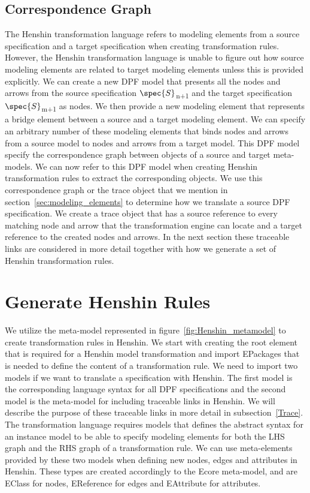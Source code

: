 \subsection{Correspondence Graph}
The Henshin transformation language refers to modeling elements from a source
specification and a target specification when creating transformation rules.
However, the Henshin transformation language is unable to figure out how source
modeling elements are related to target modeling elements unless this is
provided explicitly. We can create a new DPF model that presents all the nodes
and arrows from the source specification $\spec{S}$\textsubscript{n+1} and
the target specification $\spec{S}$\textsubscript{m+1} as nodes. We then provide
a new modeling element that represents a bridge element between a source and a
target modeling element. We can specify an arbitrary number of these
modeling elements that binds nodes and arrows from a source model to nodes and
arrows from a target model. This DPF model specify the correspondence graph
between objects of a source and target meta-models. We can now refer to this
DPF model when creating Henshin transformation rules to extract the
corresponding objects. We use this correspondence graph or the trace object
that we mention in section~\ref{sec:modeling_elements} to determine how we
translate a source DPF specification. We create a trace object that has a
source reference to every matching node and arrow that the transformation
engine can locate and a target reference to the created nodes and arrows. In the
next section these traceable links are considered in more detail together
with how we generate a set of Henshin transformation rules.

\section{Generate Henshin Rules}
\label{hensin_rules}

We utilize the meta-model represented in figure~\ref{fig:Henshin_metamodel} to
create transformation rules in Henshin. We start with creating the root element
that is required for a Henshin model transformation and import EPackages that
is needed to define the content of a transformation rule. We need to import two
models if we want to translate a specification with Henshin. The first model is
the corresponding language syntax for all DPF specifications and the second
model is the meta-model for including traceable links in Henshin. We will describe the
purpose of these traceable links in more detail in subsection~\ref{Trace}. The
transformation language requires models that defines the abstract syntax for an
instance model to be able to specify modeling elements for both the LHS graph
and the RHS graph of a transformation rule. We can use meta-elements provided
by these two models when defining new nodes, edges and attributes in Henshin.
These types are created accordingly to the Ecore meta-model, and are EClass for
nodes, EReference for edges and EAttribute for attributes.

